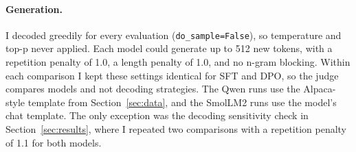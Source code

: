 \paragraph{Generation.} I decoded greedily for every evaluation (\texttt{do\_sample=False}), so temperature and top-p never applied. Each model could generate up to 512 new tokens, with a repetition penalty of 1.0, a length penalty of 1.0, and no n-gram blocking. Within each comparison I kept these settings identical for SFT and DPO, so the judge compares models and not decoding strategies. The Qwen runs use the Alpaca-style template from Section~\ref{sec:data}, and the SmolLM2 runs use the model's chat template. The only exception was the decoding sensitivity check in Section~\ref{sec:results}, where I repeated two comparisons with a repetition penalty of 1.1 for both models.